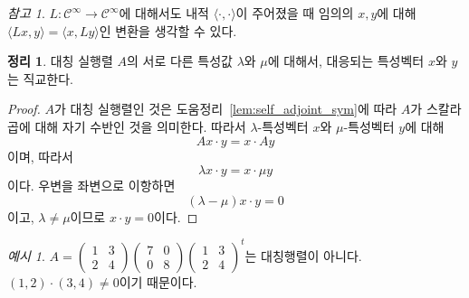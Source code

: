 \documentclass[unfonts,oneside,a4paper]{oblivoir}
\theoremstyle{definition}
\theoremstyle{theorem}
\newtheorem{theorem}{정리}[section]
\theoremstyle{theorem}
\theoremstyle{remark}
\newtheorem*{remark}{참고}
\theoremstyle{remark}
\theoremstyle{remark}
\newtheorem*{example}{예시}
\theoremstyle{remark}
\renewcommand{\vec}[1]{\bm{\mathit{#1}}}
\begin{document}
\begin{remark}
    $L: \mathcal C^\infty \rightarrow \mathcal C^\infty$에 대해서도 내적 $\langle \cdot, \cdot \rangle$이 주어졌을 때 임의의 $x, y$에 대해 $\langle L x, y \rangle = \langle x, Ly \rangle$인 변환을 생각할 수 있다.
\end{remark}

\begin{theorem} \label{thm:sym_eigenvector_orthogonal}
    대칭 실행렬 $A$의 서로 다른 특성값 $\lambda$와 $\mu$에 대해서, 대응되는 특성벡터 $\vec x$와 $\vec y$는 직교한다.
\end{theorem}

\begin{proof}
    $A$가 대칭 실행렬인 것은 도움정리~\ref{lem:self_adjoint_sym}에 따라 $A$가 스칼라곱에 대해 자기 수반인 것을 의미한다.
    따라서 $\lambda$-특성벡터 $\vec x$와 $\mu$-특성벡터 $\vec y$에 대해
    \begin{equation*}
        A \vec x \cdot \vec y = \vec x \cdot A \vec y
    \end{equation*}
    이며, 따라서
    \begin{equation*}
        \lambda \vec x \cdot \vec y = \vec x \cdot \mu \vec y
    \end{equation*}
    이다.
    우변을 좌변으로 이항하면
    \begin{equation*}
        (\lambda - \mu) \vec x \cdot \vec y = 0
    \end{equation*}
    이고, $\lambda \neq \mu$이므로 $\vec x \cdot \vec y = 0$이다.
\end{proof}

\begin{example}
    $A = \begin{pmatrix}1 & 3\\2 & 4\end{pmatrix} \begin{pmatrix}7 & 0\\ 0 & 8\end{pmatrix}\begin{pmatrix}1 & 3\\2 & 4\end{pmatrix}^t$는 대칭행렬이 아니다.
    $(1, 2) \cdot (3, 4) \neq 0$이기 때문이다.
\end{example}
\end{document}
